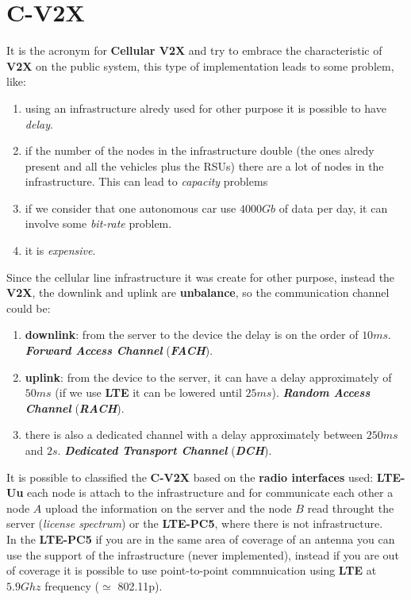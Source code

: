 \section{C-V2X}
It is the acronym for \textbf{Cellular V2X} and try to embrace the characteristic of \textbf{V2X} on the public system, this type of implementation leads to some problem, like: 
\begin{enumerate}[nosep]
    \item using an infrastructure alredy used for other purpose it is possible to have \textit{delay}.
    \item if the number of the nodes in the infrastructure double (the ones alredy present and all the vehicles plus the RSUs) there are a lot of nodes in the infrastructure. This can lead to \textit{capacity} problems
    \item if we consider that one autonomous car use $4000Gb$ of data per day, it can involve some \textit{bit-rate} problem.
    \item it is \textit{expensive}.
\end{enumerate}
Since the cellular line infrastructure it was create for other purpose, instead the \textbf{V2X}, the downlink and uplink are \textbf{unbalance}, so the communication channel could be:
\begin{enumerate}[nosep]
    \item \textbf{downlink}: from the server to the device the delay is on the order of $10ms$. \textbf{\textit{Forward Access Channel}} (\textbf{\textit{FACH}}).
    \item \textbf{uplink}: from the device to the server, it can have a delay approximately of $50ms$ (if we use \textbf{LTE} it can be lowered until $25ms$). \textbf{\textit{Random Access Channel}} (\textbf{\textit{RACH}}).
    \item there is also a dedicated channel with a delay approximately between $250ms$ and $2s$. \textbf{\textit{Dedicated Transport Channel}} (\textbf{\textit{DCH}}).
\end{enumerate}
It is possible to classified the \textbf{C-V2X} based on the \textbf{radio interfaces} used: \textbf{LTE-Uu} each node is attach to the infrastructure and for communicate each other a node $A$ upload the information on the server and the node $B$ read throught the server (\textit{license spectrum}) or the \textbf{LTE-PC5}, where there is not infrastructure. \\
In the \textbf{LTE-PC5} if you are in the same area of coverage of an antenna you can use the support of the infrastructure (never implemented), instead if you are out of coverage it is possible to use point-to-point commnuication using \textbf{LTE} at $5.9Ghz$ frequency ($\simeq$ 802.11p). \\
